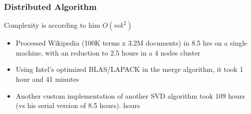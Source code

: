 \begin{frame}[plain]
\frametitle{Distributed Algorithm}
\begin{block}{}
      Complexity is according to him $O(mk^2)$
      \begin{itemize}
      \item Processed Wikipedia (100K terms x 3.2M documents) in 8.5
        hrs on a single machine, with an reduction to 2.5 hours in a 4 nodes cluster
      \item Using Intel's optimized BLAS/LAPACK in the merge algorithm,
        it took 1 hour and 41 minutes
      \item Another custom implementation of another SVD algorithm
        took 109 hours (vs his serial version of 8.5 hours).
hours
      \end{itemize}
\end{block} 
\end{frame}
